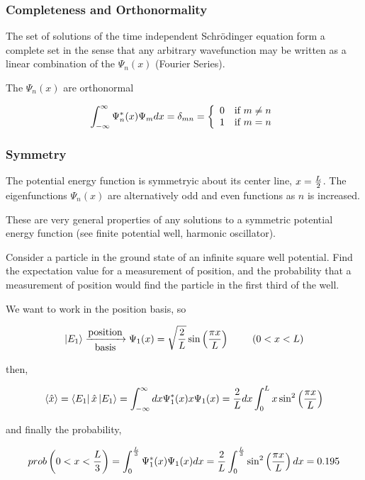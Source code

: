 \documentclass[english, 11pt]{article}
\begin{document}
      \subsubsection{Completeness and Orthonormality}

        The set of solutions of the time independent Schrödinger equation form a complete set in the sense that any arbitrary wavefunction may be written as a linear combination of the $\Psi_n(x)$ (Fourier Series). \newline

        The $\Psi_n(x)$ are orthonormal

        \[ \int_{-\infty}^{\infty} \Psi_{n}^*(x)\Psi_{m} dx = \delta_{mn} = \left\{ \begin{array}{lr} 0 & \mbox{if $m \not = n$} \\ 1 & \mbox{if $m = n$} \end{array} \right. \]

      \subsubsection{Symmetry}

        The potential energy function is symmetryic about its center line, $x = \frac{L}{2}$. The eigenfunctions $\Psi_n(x)$ are alternatively odd and even functions as $n$ is increased.\newline

      These are very general properties of any solutions to a symmetric potential energy function (see finite potential well, harmonic oscillator).

      \begin{exmp}
        Consider a particle in the ground state of an infinite square well potential. Find the expectation value for a measurement of position, and the probability that a measurement of position would find the particle in the first third of the well.
      \end{exmp}

      We want to work in the position basis, so

      \[ \left|E_1\right\rangle \xrightarrow[\mbox{basis}]{\mbox{position}} \Psi_1(x) = \sqrt{\frac{2}{L}}\sin \left( \frac{\pi x}{L} \right) \ \ \ \ \ \ \ (0 < x < L) \]

      then,

      \[ \langle \hat{x} \rangle = \left\langle E_1\right|\hat{x}\left|E_1\right\rangle = \int_{-\infty}^{\infty} dx \Psi_1^*(x)x\Psi_1(x) = \frac{2}{L} dx \int_0^L x\sin^2 \left( \frac{\pi x}{L} \right) \]

      and finally the probability,

      \[ prob\left(0<x<\frac{L}{3}\right) = \int_0^{\frac{L}{3}}\Psi_1^*(x)\Psi_1(x)dx = \frac{2}{L} \int_0^{\frac{L}{3}} \sin^2 \left( \frac{\pi x}{L}\right) dx = 0.195  \]
\end{document}
